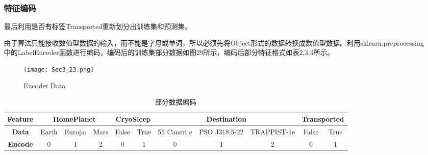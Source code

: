 \documentclass[../main.tex]{subfiles}
\begin{document}
        \subsubsection{特征编码}

            最后利用是否有标签Transported重新划分出训练集和预测集。
            
            由于算法只能接收数值型数据的输入，而不能是字母或单词，所以必须先将Object形式的数据转换成数值型数据。利用sklearn.preprocessing中的LabelEncoder函数进行编码，编码后的训练集部分数据如图29所示，编码后部分特征格式如表2,3,4所示。

            \begin{figure}[H]
                \centering
                \texttt{[image: Sec3\_23.png]}
                \caption{Encoder Data}
            \end{figure}

            \begin{table}[H]
                \footnotesize
                \centering
                \begin{tabular}{|c|ccc|cc|ccc|cc|}
                \hline
                \textbf{Feature} & \multicolumn{3}{c|}{\textbf{HomePlanet}}                        & \multicolumn{2}{c|}{\textbf{CryoSleep}} & \multicolumn{3}{c|}{\textbf{Destination}}                                            & \multicolumn{2}{c|}{\textbf{Transported}}  \\ \hline
                \textbf{Data}    & \multicolumn{1}{c|}{Earth} & \multicolumn{1}{c|}{Europa} & Mars & \multicolumn{1}{c|}{False}    & True    & \multicolumn{1}{c|}{55 Cancri e} & \multicolumn{1}{c|}{PSO J318.5-22} & TRAPPIST-1e  & \multicolumn{1}{c|}{False}     & True      \\ \hline
                \textbf{Encode}  & \multicolumn{1}{c|}{0}     & \multicolumn{1}{c|}{1}      & 2    & \multicolumn{1}{c|}{0}        & 1       & \multicolumn{1}{c|}{0}           & \multicolumn{1}{c|}{1}             & 2            & \multicolumn{1}{c|}{0}         & 1         \\ \hline
                \end{tabular}
                \caption{部分数据编码}
            \end{table}
\end{document}
